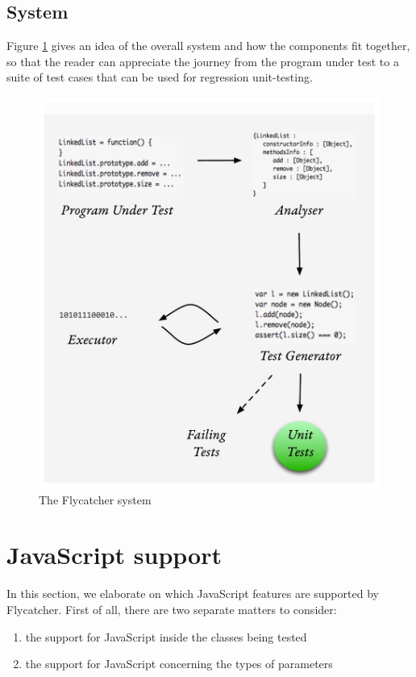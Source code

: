 \subsection{System}
Figure \ref{system} gives an idea of the overall system and how the components fit together, so that the reader can appreciate the journey from the program under test to a suite of test cases that can be used for regression unit-testing.

\begin{figure}[h]
\centering
\includegraphics[scale=0.55]{./components/chapter3/system9.pdf}
\caption{The \textsf{Flycatcher} system}
\label{system}
\end{figure}

\section{JavaScript support}
In this section, we elaborate on which JavaScript features are supported by \textsf{Flycatcher}. First of all, there are two separate matters to consider:

\begin{enumerate}
   \item the support for JavaScript inside the classes being tested
   \item the support for JavaScript concerning the types of parameters
\end{enumerate}

